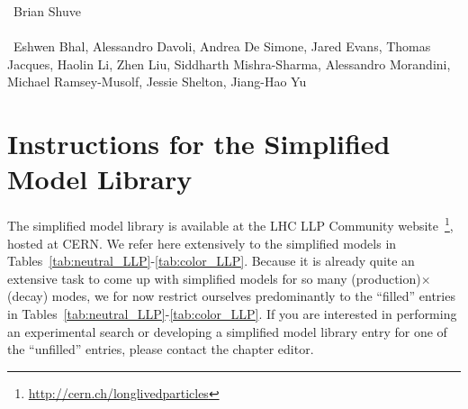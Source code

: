 ~Brian Shuve \\
\text{ \; }\\
~Eshwen Bhal, Alessandro Davoli, Andrea De Simone, Jared Evans, Thomas Jacques, Haolin Li, Zhen Liu, Siddharth Mishra-Sharma, Alessandro Morandini, Michael Ramsey-Musolf, Jessie Shelton, Jiang-Hao Yu
\text{ \; }\\

\section{Instructions for the Simplified Model Library}

The simplified model library is available at the LHC LLP Community website~\footnote{\url{http://cern.ch/longlivedparticles}}, hosted at CERN. We refer here extensively to the simplified models in Tables~\ref{tab:neutral_LLP}-\ref{tab:color_LLP}. Because it is already quite an extensive task to come up with simplified models for so many (production)$\times$(decay) modes, we for now restrict ourselves predominantly to the ``filled'' entries in Tables~\ref{tab:neutral_LLP}-\ref{tab:color_LLP}. If you are interested in performing an experimental search or developing a simplified model library entry for one of the ``unfilled'' entries, please contact the chapter editor.

